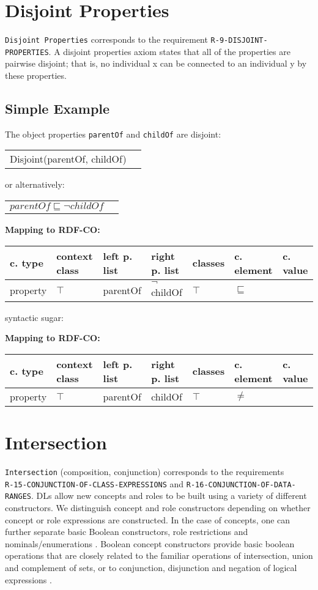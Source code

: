 \documentclass{llncs}
\newcommand{\ms}[1]{\texttt{#1}}
\newenvironment{gcotable}{
  \scriptsize
  \sffamily
  \vspace{0cm}
	\begin{center}
	\textbf{\vspace{0.4cm}Mapping to RDF-CO:} \\
  \begin{tabular}{l|l|l|l|l|l|l}
	\hline
  \textbf{c. type} & \textbf{context class} & \textbf{left p. list} & \textbf{right p. list} & \textbf{classes} & \textbf{c. element} & \textbf{c. value} \\
  \hline

}{
  \hline
  \end{tabular}
	\end{center}
}
\newenvironment{DL}{
  \vspace{0cm}
	\begin{center}
  \begin{tabular}{r l}

}{
  \end{tabular}
	\end{center}
}
\begin{document}
\section{Disjoint Properties}

\ms{Disjoint Properties} corresponds to the requirement \ms{R-9-DISJOINT-PROPERTIES}.
A disjoint properties axiom states that all of the properties are pairwise disjoint; 
that is, no individual x can be connected to an individual y by these properties. 

\subsection{Simple Example}

The object properties \ms{parentOf} and \ms{childOf} are disjoint:

\begin{DL}
Disjoint(parentOf, childOf)\\
\end{DL}

or alternatively:

\begin{DL}
$parentOf \sqsubseteq \neg childOf$
\end{DL}

\begin{gcotable}
property & $\top$ & parentOf & $\neg$childOf & $\top$ & $\sqsubseteq$ \\
\end{gcotable}

syntactic sugar:

\begin{gcotable}
property & $\top$ & parentOf & childOf & $\top$ & $\ne$ \\
\end{gcotable}

\section{Intersection}

\ms{Intersection} (composition, conjunction) corresponds to the requirements \\
\ms{R-15-CONJUNCTION-OF-CLASS-EXPRESSIONS} and \ms{R-16-CONJUNCTION-OF-DATA-} \ms{RANGES}.
DLs allow new concepts and roles to be
built using a variety of different constructors. We distinguish concept and role 
constructors depending on whether concept or role expressions are constructed. In the case of
concepts, one can further separate basic Boolean constructors, role restrictions and nominals/enumerations \cite{Kroetzsch2012}.
Boolean concept constructors provide basic boolean operations that are closely related to
the familiar operations of intersection, union and complement of sets, or to conjunction,
disjunction and negation of logical expressions \cite{Kroetzsch2012}.
\end{document}
